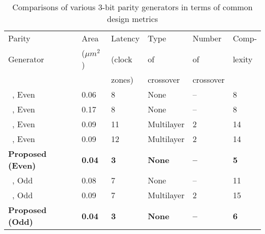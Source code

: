 \documentclass[conference]{IEEEtran}
\begin{document}
\begin{table}[!htb]
\begin{center}
\scriptsize
\caption{\small Comparisons of various $3$-bit parity generators in terms of common design metrics}
\label{tab:existingXOR3comp}
\vspace{0.3cm}
\begin{tabular}{|l|l|l|l|l|l|}
\hline
Parity & Area & Latency & Type & Number  & Comp-  \\
Generator & ($\mu m^2$) & (clock  & of & of & lexity\\
& & zones) & crossover & crossover & \\
\hline       
~\cite{S_utpal2014}, Even & 0.06 & 8 & None & -- & 8 \\ 
\hline
~\cite{beigh_ijpap2013}, Even & 0.17 & 8 & None & -- & 8 \\
\hline
~\cite{firdous_2015}, Even  & 0.09  & 11 & Multilayer & 2 & 14 \\
\hline
~\cite{firdous_bhat2014}, Even & 0.09 & 12 & Multilayer & 2 & 14 \\
\hline
{\bf Proposed (Even)} & {\bf 0.04} & {\bf 3} & {\bf None} & {\bf --} & {\bf 5} \\
\hline
~\cite{Das_FITEE_2016}, Odd & 0.08 & 7 & None & -- & 11 \\
\hline
~\cite{firdous_2015}, Odd  & 0.09 & 7 & Multilayer & 2 & 15 \\
\hline
{\bf Proposed (Odd)} & {\bf 0.04} & {\bf 3} & {\bf None} & {\bf --} & {\bf 6} \\
\hline
\end{tabular}
\end{center}
\end{table}
\end{document}
